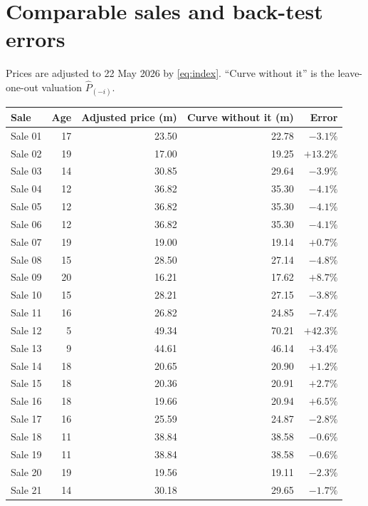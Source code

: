 \documentclass[11pt,a4paper]{article}
\newcommand{\usd}[1]{\text{US\$}#1}
\begin{document}
\nocite{Stopford2009,Tsolakis2003}

\appendix
\section{Comparable sales and back-test errors}
\label{app:data}

Prices are adjusted to 22 May 2026 by \eqref{eq:index}. ``Curve without it'' is the leave-one-out valuation $\hat P_{(-i)}$.

\begin{center}
\small
\begin{longtable}{@{}l r r r r@{}}
\toprule
Sale & Age & Adjusted price (\usd{}m) & Curve without it (\usd{}m) & Error \\
\midrule
\endhead
Sale 01 & 17 & 23.50 & 22.78 & $-3.1\%$ \\
Sale 02 & 19 & 17.00 & 19.25 & $+13.2\%$ \\
Sale 03 & 14 & 30.85 & 29.64 & $-3.9\%$ \\
Sale 04 & 12 & 36.82 & 35.30 & $-4.1\%$ \\
Sale 05 & 12 & 36.82 & 35.30 & $-4.1\%$ \\
Sale 06 & 12 & 36.82 & 35.30 & $-4.1\%$ \\
Sale 07 & 19 & 19.00 & 19.14 & $+0.7\%$ \\
Sale 08 & 15 & 28.50 & 27.14 & $-4.8\%$ \\
Sale 09 & 20 & 16.21 & 17.62 & $+8.7\%$ \\
Sale 10 & 15 & 28.21 & 27.15 & $-3.8\%$ \\
Sale 11 & 16 & 26.82 & 24.85 & $-7.4\%$ \\
Sale 12 & 5 & 49.34 & 70.21 & $+42.3\%$ \\
Sale 13 & 9 & 44.61 & 46.14 & $+3.4\%$ \\
Sale 14 & 18 & 20.65 & 20.90 & $+1.2\%$ \\
Sale 15 & 18 & 20.36 & 20.91 & $+2.7\%$ \\
Sale 16 & 18 & 19.66 & 20.94 & $+6.5\%$ \\
Sale 17 & 16 & 25.59 & 24.87 & $-2.8\%$ \\
Sale 18 & 11 & 38.84 & 38.58 & $-0.6\%$ \\
Sale 19 & 11 & 38.84 & 38.58 & $-0.6\%$ \\
Sale 20 & 19 & 19.56 & 19.11 & $-2.3\%$ \\
Sale 21 & 14 & 30.18 & 29.65 & $-1.7\%$ \\

\end{longtable}
\end{center}
\end{document}

